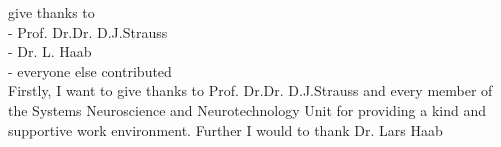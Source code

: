 
give thanks to\\
- Prof. Dr.Dr. D.J.Strauss\\
- Dr. L. Haab\\
- everyone else contributed\\

Firstly, I want to give thanks to Prof. Dr.Dr. D.J.Strauss and every member of the Systems Neuroscience and Neurotechnology Unit for providing a kind and supportive work environment. Further I would to thank Dr. Lars Haab 